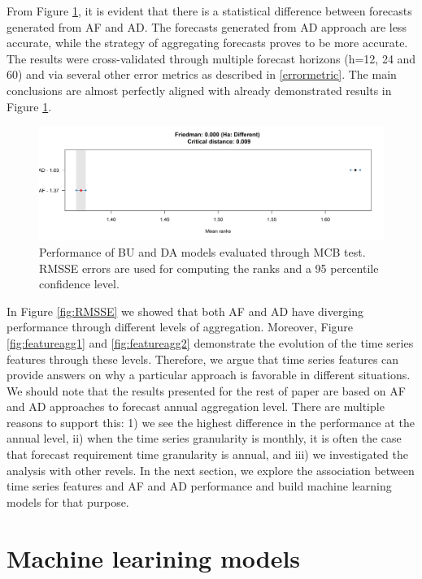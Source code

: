 \documentclass[preprint, 3p,
authoryear]{elsarticle} %
\begin{document}
From Figure \ref{fig:MCB}, it is evident that there is a statistical
difference between forecasts generated from AF and AD. The forecasts
generated from AD approach are less accurate, while the strategy of
aggregating forecasts proves to be more accurate. The results were
cross-validated through multiple forecast horizons (h=12, 24 and 60) and
via several other error metrics as described in \ref{errormetric}. The
main conclusions are almost perfectly aligned with already demonstrated
results in Figure \ref{fig:MCB}.

\begin{figure}[H]

{\centering \includegraphics[width=1\linewidth]{img/300dpi/Fig_MCB} 

}

\caption{Performance of BU and DA models evaluated through MCB test. RMSSE errors are used for computing the ranks and a 95 percentile confidence level.}\label{fig:MCB}
\end{figure}

In Figure \ref{fig:RMSSE} we showed that both AF and AD have diverging
performance through different levels of aggregation. Moreover, Figure
\ref{fig:featureagg1} and \ref{fig:featureagg2} demonstrate the
evolution of the time series features through these levels. Therefore,
we argue that time series features can provide answers on why a
particular approach is favorable in different situations. We should note
that the results presented for the rest of paper are based on AF and AD
approaches to forecast annual aggregation level. There are multiple
reasons to support this: 1) we see the highest difference in the
performance at the annual level, ii) when the time series granularity is
monthly, it is often the case that forecast requirement time granularity
is annual, and iii) we investigated the analysis with other revels. In
the next section, we explore the association between time series
features and AF and AD performance and build machine learning models for
that purpose.

\hypertarget{ml}{%
\section{Machine learining models}\label{ml}}
\end{document}
